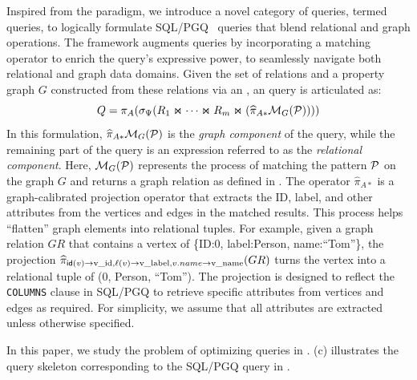 Inspired from the \spj paradigm, we introduce a novel category of queries, termed \spjm queries, to logically formulate SQL/PGQ~\cite{sql-pgq} queries that
blend relational and graph operations.
The \spjm framework augments \spj queries by incorporating a matching operator to  enrich the query's expressive power, to seamlessly navigate both relational and graph data domains.
Given the set of relations and a property graph \(G\) constructed from these relations via an \rgmapping, %
an \spjm query is articulated as:
\begin{equation}
    \label{eq:spjm}
Q = \pi_A(\sigma_\Psi(R_1 \Join \cdots \Join R_m \Join (\widehat{\pi}_{A*}\mathcal{M}_G(\mathcal{P}))))
\end{equation}
In this formulation, \(\widehat{\pi}_{A*}\mathcal{M}_G(\mathcal{P})\) is the \emph{graph component} of
the query, while the remaining part of the query is an \spj expression referred to as the \emph{relational component}.
Here, \(\mathcal{M}_G(\mathcal{P})\) represents the process of matching the pattern \(\mathcal{P}\) on the graph \(G\) and
returns a graph relation as defined in . The operator \(\widehat{\pi}_{A*}\) is a
graph-calibrated projection operator that extracts the ID, label, and other attributes from the vertices and edges in the matched results.
This process helps ``flatten'' graph elements into relational tuples.
For example, given a graph relation $GR$ that contains a vertex of \{ID:0, label:Person, name:``Tom''\}, the
 projection
$\widehat{\pi}_{{\mathsf{id}}(v) \rightarrow \text{v\_id}, \mathcal{\ell}(v) \rightarrow \text{v\_label}, v.name \rightarrow \text{v\_name}}(GR)$
turns the vertex into a relational tuple of (0, Person, ``Tom'').
The projection is designed to reflect the \lstinline{COLUMNS} clause in SQL/PGQ
to retrieve specific attributes from vertices and edges as required. For simplicity, we assume that all
attributes are extracted unless otherwise specified.

In this paper, we study the problem of optimizing \spjm queries in . (c) illustrates the \spjm query skeleton corresponding to the SQL/PGQ query in .


